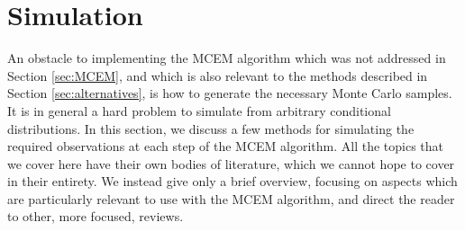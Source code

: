 \documentclass[ss]{imsart}
\theoremstyle{plain}
\theoremstyle{definition}
\theoremstyle{remark}
\newcommand{\bQ}{\mathbb{Q}}
\begin{document}
\begin{comment}
A major advantage of the mean-field approximation is that an iterative algorithm exists for finding the density, $q$, which maximizes the ELBO. This algorithm performs coordinate ascent, and the coordinate updates are closely related to computation of the full conditional distributions in Gibbs sampling \citep{need}. Write $q^{(k)} = \prod q_j^{(k)}$ for the current value of $q$, and $\bQ^{(k)}_{-j}$ for expectation with respect to all the missing variables except $j$, under $q^{(k)}$. The update formula is
%
\begin{align}
    q_j^{(k+1)} &\propto \exp \left[ \bQ^{(k)}_{-j} \ell_c(y, x_j, X_{-j}) \right] \label{eq:var_inf_update}
\end{align}
%
where $X_{-j}$ is all the missing variables other than $X_j$. See Section 2.4 of \citet{Ble17} for a derivation of (\ref{eq:var_inf_update}). The overall algorithm consists of repeatedly cycling through updating each coordinate's distribution until some convergence criterion is met.

Note that, so far, our discussion of how to compute the mean-field approximate density for $X$ has not addressed $\theta$. To apply mean-field variational inference to EM-type problems, we substitute the mean-field density into the ELBO and maximize over $\theta$. This new value of $\theta$ is fed back into ($\ref{eq:var_inf_update}$), giving us a different complete data likelihood function and, hence, a new optimal density.
\end{comment}




\section{Simulation}
\label{sec:simulation}

An obstacle to implementing the MCEM algorithm which was not addressed in Section \ref{sec:MCEM}, and which is also relevant to the methods described in Section \ref{sec:alternatives}, is how to generate the necessary Monte Carlo samples. It is in general a hard problem to simulate from arbitrary conditional distributions. In this section, we discuss a few methods for simulating the required observations at each step of the MCEM algorithm. All the topics that we cover here have their own bodies of literature, which we cannot hope to cover in their entirety. We instead give only a brief overview, focusing on aspects which are particularly relevant to use with the MCEM algorithm, and direct the reader to other, more focused, reviews.
\end{document}
